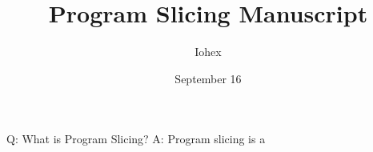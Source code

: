 \documentclass[a4paper, 12pt]{paper}
\title{Program Slicing Manuscript}
\author{Iohex}
\date{September 16}
\begin{document}
\maketitle

Q: What is Program Slicing?
A: Program slicing is a 
\end{document}
